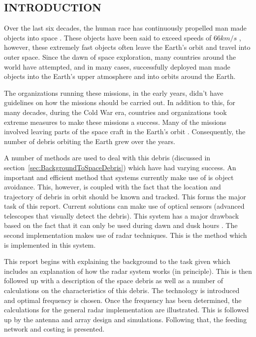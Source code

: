 \documentclass[11pt]{witseiepaper}
\begin{document}
\begin{bibunit}[witseie]
\section{INTRODUCTION} \label{sec:INTRODUCTION}

Over the last six decades, the human race has continuously propelled man made objects into space \cite{sputnik}. These objects have been said to exceed speeds of $66 km/s$ \cite{fastestObject}, however, these extremely fast objects often leave the Earth's orbit and travel into outer space. Since the dawn of space exploration, many countries around the world have attempted, and in many cases, successfully deployed man made objects into the Earth's upper atmosphere and into orbits around the Earth.

The organizations running these missions, in the early years, didn't have guidelines on how the missions should be carried out. In addition to this, for many decades, during the Cold War era, countries and organizations took extreme measures to make these missions a success. Many of the missions involved leaving parts of the space craft in the Earth's orbit \cite{spaceDebrisGuide}. Consequently, the number of debris orbiting the Earth grew over the years.

A number of methods are used to deal with this debris (discussed in section~\ref{sec:BackgroundToSpaceDebris}) which have had varying success.
An important and efficient method that systems currently make use of is object avoidance. This, however, is coupled with the fact that the location and trajectory of debris in orbit should be known and tracked. This forms the major task of this report.
Current solutions can make use of optical sensors (advanced telescopes that visually detect the debris). This system has a major drawback based on the fact that it can only be used during dawn and dusk hours \cite{OrbitalDebrisTechnicalAssessment,telescope,ZenithRanging}.
The second implementation makes use of radar techniques. This is the method which is implemented in this system.

This report begins with explaining the background to the task given which includes an explanation of how the radar system works (in principle). This is then followed up with a description of the space debris as well as a number of calculations on the characteristics of this debris. The technology is introduced and optimal frequency is chosen. Once the frequency has been determined, the calculations for the general radar implementation are illustrated.
This is followed up by the antenna and array design and simulations. Following that, the feeding network and costing is presented.




\end{bibunit}
\end{document}
